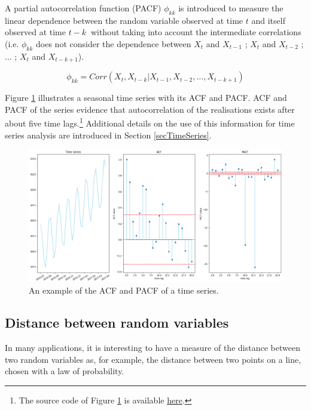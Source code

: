 A partial autocorrelation function (PACF) $\phi_{kk}$ is introduced to measure the linear dependence between the random variable observed at time $t$ and itself observed at time $t-k\ $ without taking into account the intermediate correlations (i.e. $\phi_{kk}$ does not consider the dependence between $X_t$ and $X_{t-1}$ ; $X_t$ and $X_{t-2}$ ; ... ; $X_t$ and $X_{t-k+1}$).

\begin{equation}
\phi_{kk}=Corr(X_t,X_{t-k}|X_{t-1},X_{t-2},\ldots,X_{t-k+1})
\label{eq_PACF}
\end{equation}

Figure \ref{fig_ACFPACF} illustrates a seasonal time series with its ACF and PACF. ACF and PACF of the series evidence that autocorrelation of the realisations exists after about five time lags.\footnote{The source code of Figure \ref{fig_ACFPACF} is available \href{https://github.com/aletuf93/logproj/blob/master/examples/02.\%20Time\%20Series.ipynb}{here}.} Additional details on the use of this information for time series analysis are introduced in Section \ref{secTimeSeries}.

\begin{figure}[hbt!]
\centering
\includegraphics[width=1\textwidth]{SectionLetsMath/elemStat_figures/fig_ACFPACF.png}
\captionsetup{type=figure}
\caption{An example of the ACF and PACF of a time series.}
\label{fig_ACFPACF}
\end{figure}

\subsection{Distance between random variables}
In many applications, it is interesting to have a measure of the distance between two random variables as, for example, the distance between two points on a line, chosen with a law of probability. \par

